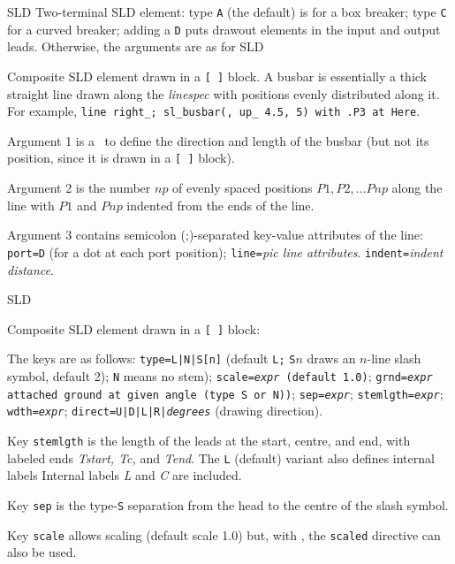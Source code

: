   {SLD}%
  {Two-terminal SLD element:
   type {\tt A} (the default) is for a box breaker; type 
   {\tt C} for a curved breaker; adding a {\tt D} puts drawout elements
   in the input and output leads.
   Otherwise, the arguments are as for 
   }%
%
  {SLD}%
  {Composite SLD element drawn in a {\tt [ ]} block.  A busbar is
   essentially a thick straight line 
   drawn along the {\sl linespec} with positions evenly distributed
   along it.  For example,
     {\tt line right\_; sl\_busbar(, up\_ 4.5, 5) with .P3 at Here}.

   Argument 1 is a \linespec\ to define the direction and length of the
     busbar (but not its position, since it is drawn in a {\tt [ ]} block).

   Argument 2 is the number $np$ of evenly spaced positions
     $P1, P2, \ldots Pnp$ along the line with $P1$ and $Pnp$ indented
     from the ends of the line.

   Argument 3 contains semicolon (;)-separated key-value attributes
     of the line:
   {\tt port=D} (for a dot at each port position);
   {\tt line=}{\sl pic line attributes}.
   {\tt indent=}{\sl indent distance}.
   }%
%
  {SLD}%
  {Composite SLD element drawn in a {\tt [ ]} block:

   The keys are as follows:
   {\tt type=L|N|S[n]} (default {\tt L;} {\tt S$n$} draws an $n$-line slash
     symbol, default 2); {\tt N} means no stem);
   {\tt scale={\sl expr} (default 1.0)};
   {\tt grnd={\sl expr} attached ground at given angle
     (type {\tt S} or {\tt N}))};
   {\tt sep={\sl{}expr}};
   {\tt stemlgth={\sl{}expr}};
   {\tt wdth={\sl{}expr}};
   {\tt direct=U|D|L|R|{\sl degrees}} (drawing direction).

   Key {\tt stemlgth} is the length of the leads at the start, centre, and end,
     with labeled ends {\sl Tstart, Tc,} and {\sl Tend}.
     The {\tt L} (default) variant also defines internal labels
     Internal labels {\sl L} and {\sl C} are included.

   Key {\tt sep} is the type-{\tt S} separation from the head to the centre
     of the slash symbol.

   Key {\tt scale} allows scaling (default scale 1.0) but, with \dpic,
     the {\tt scaled} directive can also be used.
   }%
%
